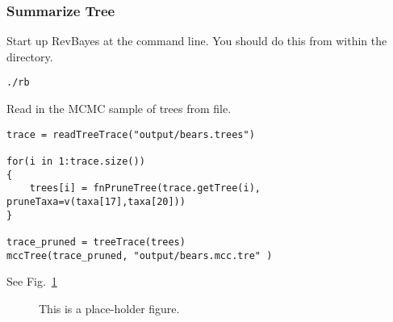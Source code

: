 

\medskip
\subsubsection{Summarize Tree}\label{subsub:RB-SummarizeTree}


Start up RevBayes at the command line. You should do this from within the  directory.
{\tt \begin{snugshade*}
\begin{lstlisting}
./rb
\end{lstlisting}
\end{snugshade*}}

Read in the MCMC sample of trees from file.
{\tt \begin{snugshade*}
\begin{lstlisting}
trace = readTreeTrace("output/bears.trees")

for(i in 1:trace.size())
{
    trees[i] = fnPruneTree(trace.getTree(i), pruneTaxa=v(taxa[17],taxa[20]))
}

trace_pruned = treeTrace(trees)
mccTree(trace_pruned, "output/bears.mcc.tre" )
\end{lstlisting}
\end{snugshade*}}

See Fig.\ \ref{fig:IcyTreeSumm}

\begin{figure}[h!]
\centering
{}
\caption{\small This is a place-holder figure.}
\label{fig:IcyTreeSumm}
\end{figure}





